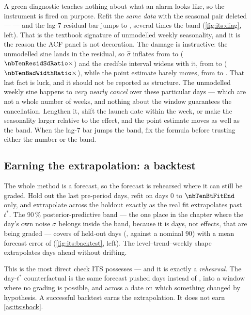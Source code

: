 A green diagnostic teaches nothing about what an alarm looks like, so the instrument is fired on
purpose. Refit the \emph{same data} with the seasonal pair deleted ---  --- and the lag-7 residual bar jumps to \nbTenAcfBadSeven, several times the band
(\cref{fig:its:diag}, left). That is the textbook signature of unmodelled weekly seasonality, and
it is the reason the ACF panel is not decoration. The damage is instructive: the unmodelled sine
lands in the residual, so $\hat\sigma$ inflates from \pp{\nbTenResidSd} to \pp{\nbTenResidSdBad}
($\nbTenResidSdRatio\times$) and the credible interval widens with it, from \pp{\nbTenOkWidth} to
\pp{\nbTenBadWidth} ($\nbTenBadWidthRatio\times$), while the point estimate barely moves, from
\pp{\nbTenBayesAvg} to \pp{\nbTenBadAvg}. That last fact is luck, and it should not be reported as
structure. The unmodelled weekly sine happens to \emph{very nearly cancel} over these particular
\nbTenNPost{} days --- which are not a whole number of weeks, and nothing about the window
guarantees the cancellation. Lengthen it, shift the launch date within the week, or make the
seasonality larger relative to the effect, and the point estimate moves as well as the band. When
the lag-7 bar jumps the band, fix the formula before trusting either the number or the band.



\subsection*{Earning the extrapolation: a backtest}

The whole method is a forecast, so the forecast is rehearsed where it can still be graded. Hold out
the last \nbTenHold{} pre-period days, refit on days $0$ to $\nbTenBtFitEnd$
only, and extrapolate across the holdout exactly as the real fit extrapolates past $t^{*}$. The
90\,\% posterior-predictive band --- the one place in the chapter where the day's own noise
$\sigma$ belongs inside the band, because it is days, not effects, that are being graded ---
covers \nbTenBtCovered{} of \nbTenHold{} held-out days
(\pc{\nbTenBtCovPct}, against a nominal 90) with a mean forecast error of \pp{\nbTenBtErr}
(\cref{fig:its:backtest}, left). The level--trend--weekly shape extrapolates \nbTenHold{} days
ahead without drifting.

This is the most direct check ITS possesses --- and it is exactly a \emph{rehearsal}. The day-$t^{*}$
counterfactual is the same forecast pushed \nbTenNPost{} days instead of \nbTenHold, into a window
where no grading is possible, and across a date on which something changed by hypothesis. A
successful backtest earns the extrapolation. It does not earn \cref{as:its:shock}.

